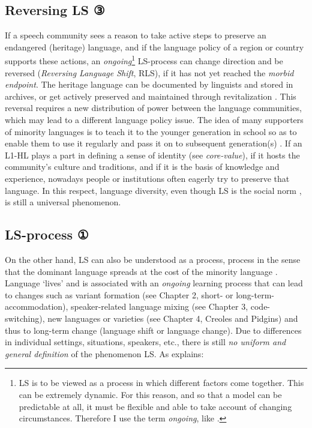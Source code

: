 \documentclass[output=paper,
modfonts
]{langscibook}
\begin{document}
\subsection*{Reversing LS ③}

If a speech community sees a reason to take active steps to preserve an endangered (heritage) language, and if the language policy of a region or country supports these actions, an \emph{ongoing}\footnote{LS is to be viewed as a process in which different factors come together. This can be extremely dynamic. For this reason, and so that a model can be predictable at all, it must be flexible and able to take account of changing circumstances. Therefore I use the term \emph{ongoing}, like \cite[112]{Pauwels2016}.} LS-process can change direction and be reversed (\emph{Reversing Language Shift}, RLS), if it has not yet reached the \emph{morbid endpoint}. The heritage language can be documented by linguists and stored in archives, or get actively preserved and maintained through revitalization \parencite[315]{Ostler2011}. This reversal requires a new distribution of power between the language communities, which may lead to a different language policy issue. The idea of many supporters of minority languages is to teach it to the younger generation in school so as to enable them to use it regularly and pass it on to subsequent generation(s) \parencite[4]{Puthuval2017}. If an L1-HL plays a part in defining a sense of identity (see \emph{core-value}), if it hosts the community's culture and traditions, and if it is the basis of knowledge and experience, nowadays people or institutions often eagerly try to preserve that language. In this respect, language diversity, even though LS is the social norm \parencite[84]{Pauwels2016}, is still a universal phenomenon.

\subsection*{LS-process ①}

On the other hand, LS can also be understood as a process, process in the sense that  the dominant language spreads at the cost of the minority language \parencite[31]{Bohm2010}. Language `lives' and is associated with an \emph{ongoing} learning process that can lead to changes such as
variant formation (see Chapter 2, short- or long-term-accommodation),
speaker-related language mixing (see Chapter 3, code-switching), 
new languages or varieties (see Chapter 4, Creoles and Pidgins) 
and thus to long-term change (language shift or language change). Due to differences in individual settings, situations, speakers, etc., there is still \emph{no uniform and general definition} of the phenomenon LS. As \cite[19]{Pauwels2016} explains:
\end{document}
